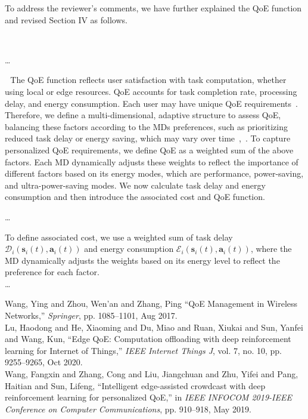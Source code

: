 \documentclass[12pt,draftclsnofoot,onecolumn]{IEEEtran}
\newcommand{\rev}[1]{{\color{blue}#1}} %
\newcommand{\rev}[1]{#1}
\newenvironment{my}[2]%
{\begin{list}{}%
{\setlength{\rightmargin}{#1}\setlength{\leftmargin}{#2}}%


 \item[]{}

} {\end{list}}
\begin{document}
\begin{enumerate}
	To address the reviewer's comments, we have further explained the QoE function and revised Section IV as follows.
	
	
	
			\begin{my}{1cm}{1cm}
		\rev{
			{\ 
				
				\dots 
				
\,\,\,\,The QoE function reflects user satisfaction with task computation, whether using local or edge resources. QoE accounts for task completion rate, processing delay, and energy consumption. Each user may have unique QoE requirements~\cite{wang2017qoe}. Therefore, we define a multi-dimensional, adaptive structure to assess QoE, balancing these factors according to the MDs preferences, such as prioritizing reduced task delay or energy saving, which may vary over time~\cite{lu2020edge},~\cite{wang2019intelligent}. To capture personalized QoE requirements, we define QoE as a weighted sum of the above factors. Each MD dynamically adjusts these weights to reflect the importance of different factors based on its energy modes, which are performance, power-saving, and ultra-power-saving modes. We now calculate task delay and energy consumption and then introduce the associated cost and QoE function.
								
				\dots
								
				To define associated cost, we use a weighted sum of task delay $\mathcal{D}_i(\boldsymbol{s}_i(t),\boldsymbol{a}_i(t))$ and energy consumption $\mathcal{E}_i(\boldsymbol{s}_i(t),\boldsymbol{a}_i(t))$, where the MD dynamically adjusts the weights based on its energy level to reflect the preference for each factor. \\\dots
}}
	\end{my}





\begin{my}{1cm}{1cm}
	\rev{
		{\small
			\noindent\hspace{-0.5mm}\cite{wang2017qoe} Wang, Ying and Zhou, Wen'an and Zhang, Ping ``QoE Management in Wireless Networks,'' \textit{Springer}, pp. 1085--1101, Aug 2017.\\[10pt]
			\cite{lu2020edge} Lu, Haodong and He, Xiaoming and Du, Miao and Ruan, Xiukai and Sun, Yanfei and Wang, Kun, ``Edge QoE: Computation offloading with deep reinforcement learning for Internet of Things,'' \textit{IEEE Internet Things J}, vol. 7, no. 10, pp. 9255--9265, Oct 2020.\\[10pt]
			\cite{wang2019intelligent} Wang, Fangxin and Zhang, Cong and Liu, Jiangchuan and Zhu, Yifei and Pang, Haitian and Sun, Lifeng, ``Intelligent edge-assisted crowdcast with deep reinforcement learning for personalized QoE,'' in \textit{IEEE INFOCOM 2019-IEEE Conference on Computer Communications}, pp. 910--918, May 2019.\\[10pt]}}
\end{my}


\end{enumerate}
\end{document}
